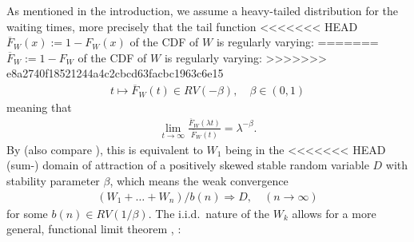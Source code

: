 \documentclass[12pt]{article}
\theoremstyle{definition}
\theoremstyle{remark}
\numberwithin{equation}{section}
\newcommand{\1}{\mathbf 1}
\begin{document}
As mentioned in the introduction, we assume a heavy-tailed distribution 
for the waiting times, more precisely that the tail function 
<<<<<<< HEAD
$\overline F_W(x) := 1 - F_W(x)$ of the CDF of $W$ is regularly varying:
=======
$\overline F_W := 1 - F_W$ of the CDF of $W$ is regularly varying:
>>>>>>> e8a2740f18521244a4c2cbcd63facbc1963c6e15
\begin{align}
t \mapsto \overline F_W(t) \in RV(-\beta), \quad \beta \in (0,1)
\end{align}
meaning that \cite{seneta,thebook}
\begin{align*}
\lim_{t \to \infty}\frac{\overline F_W(\lambda t)}{\overline F_W(t)}
= \lambda^{-\beta}.
\end{align*}
By \cite[Cor.~8.2.19]{thebook} (also compare \cite[Th.~4.5.1]{Whitt2010}), this is equivalent to $W_1$ being in the 
<<<<<<< HEAD
(sum-) domain of attraction of a positively skewed stable random variable $D$ with 
stability parameter $\beta$, which means the weak convergence
\begin{align}
(W_1 + \ldots + W_n)/b(n) \Rightarrow D, \quad (n \to \infty)
\end{align}
for some $b(n) \in RV(1/\beta)$.
The i.i.d.\ nature of the $W_k$ allows for a more general, functional limit
theorem \cite[Ex.~11.2.18]{thebook}, \cite[Th.~4.5.3]{Whitt2010}:
\end{document}
